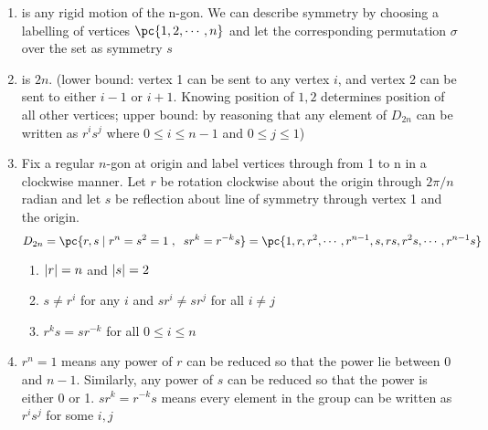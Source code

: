 \documentclass[11pt]{article}
\begin{document}
\begin{definition*}
    \begin{enumerate}
        \item {} is any rigid motion of the n-gon. We can describe symmetry by choosing a labelling of vertices $\pc{1,2,\cdots,n}$ and let the corresponding permutation $\sigma$ over the set as symmetry $s$
        \item {} is $2n$. (lower bound: vertex 1 can be sent to any vertex $i$, and vertex 2 can be sent to either $i-1$ or $i+1$. Knowing position of $1,2$ determines position of all other vertices; upper bound: by reasoning that any element of $D_{2n}$ can be written as $r^is^j$ where $0\leq i \leq n-1$ and $0\leq j \leq 1$)
        \item {} Fix a regular $n$-gon at origin and label vertices through from 1 to n in a clockwise manner. Let $r$ be rotation clockwise about the origin through $2\pi/n$ radian and let $s$ be reflection about line of symmetry through vertex 1 and the origin.
        \[
            D_{2n} = \pc{
                r,s \mid r^n = s^2 = 1 \;, \;\; sr^k = r^{-k}s
            } = 
            \pc{
                1,r,r^2,\cdots,r^{n-1}, s,rs,r^2s,\cdots, r^{n-1}s
            }
        \]
        \begin{enumerate}
            \item $\left|r\right| = n$ and $\left|s\right| = 2$
            \item $s \neq r^i$ for any $i$ and $sr^i \neq sr^j$ for all $i\neq j$
            \item $r^ks = sr^{-k}$ for all $0\leq i \leq n$
        \end{enumerate}
        \item {} $r^n = 1$ means any power of $r$ can be reduced so that the power lie between 0 and $n-1$. Similarly, any power of $s$ can be reduced so that the power is either 0 or 1. $sr^k = r^{-k}s$ means every element in the group can be written as $r^i s^j$ for some $i,j$
    \end{enumerate}
\end{definition*}
\end{document}

